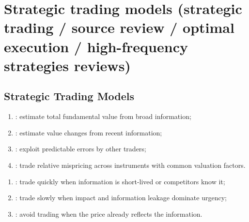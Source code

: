\documentclass[a4paper,oneside,openany]{book}
\begin{document}
\section*{Strategic trading models (strategic trading / source review / optimal execution / high-frequency strategies reviews)}

\subsection*{Strategic Trading Models}

\begin{taxonomy} 
\begin{enumerate}[label=\roman*.]
\setlength{\itemsep}{0pt}
\item {}: estimate total fundamental value from broad information;
\item {}: estimate value changes from recent information;
\item {}: exploit predictable errors by other traders;
\item {}: trade relative mispricing across instruments with common valuation factors.
\end{enumerate}
\end{taxonomy}

\begin{taxonomy} 
\begin{enumerate}[label=\roman*.]
\setlength{\itemsep}{0pt}
\item {}: trade quickly when information is short-lived or competitors know it;
\item {}: trade slowly when impact and information leakage dominate urgency;
\item {}: avoid trading when the price already reflects the information.
\end{enumerate}
\end{taxonomy}
\end{document}
